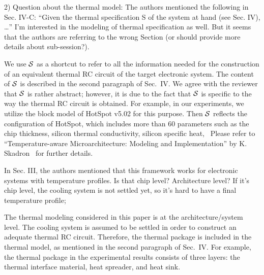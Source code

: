 \begin{reviewer}
2) Question about the thermal model: The authors mentioned the following in Sec. IV-C: ``Given the thermal specification S of the system at hand (see Sec. IV), \ldots'' I’m interested in the modeling of thermal specification as well. But it seems that the authors are referring to the wrong Section (or should provide more details about sub-session?).
\end{reviewer}
\begin{authors}
We use $\mathcal{S}$ as a shortcut to refer to all the information needed for the construction of an equivalent thermal RC circuit of the target electronic system.
The content of $\mathcal{S}$ is described in the second paragraph of Sec.~IV.
We agree with the reviewer that $\mathcal{S}$ is rather abstract; however, it is due to the fact that $\mathcal{S}$ is specific to the way the thermal RC circuit is obtained.
For example, in our experiments, we utilize the block model of HotSpot v5.02 for this purpose.
Then $\mathcal{S}$ reflects the configuration of HotSpot, which includes more than 60 parameters such as the chip thickness, silicon thermal conductivity, silicon specific heat, \etc\ Please refer to ``Temperature-aware Microarchitecture: Modeling and Implementation'' by K. Skadron \etal\ for further details.

\begin{actions}
\end{actions}
\end{authors}

\begin{reviewer}
In Sec. III, the authors mentioned that this framework works for electronic systems with temperature profiles. Is that chip level? Architecture level? If it’s chip level, the cooling system is not settled yet, so it’s hard to have a final temperature profile;
\end{reviewer}
\begin{authors}
The thermal modeling considered in this paper is at the architecture/system level.
The cooling system is assumed to be settled in order to construct an adequate thermal RC circuit.
Therefore, the thermal package is included in the thermal model, as mentioned in the second paragraph of Sec.~IV.
For example, the thermal package in the experimental results consists of three layers: the thermal interface material, heat spreader, and heat sink.

\begin{actions}
\end{actions}
\end{authors}

